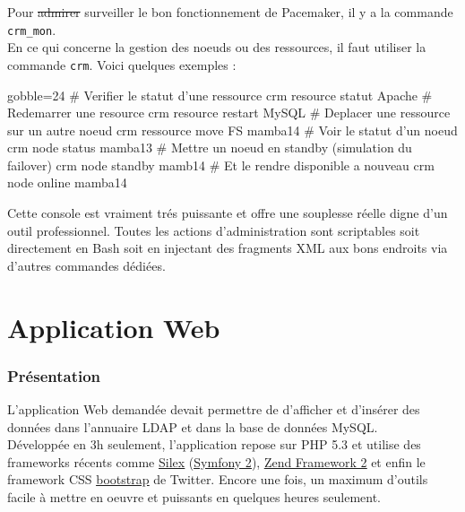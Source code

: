 \documentclass[11pt,a4paper]{report}
\begin{document}
                    Pour \st{admirer} surveiller le bon fonctionnement de Pacemaker, il y a la commande \verb+crm_mon+.\\
                    
                    En ce qui concerne la gestion des noeuds ou des ressources, il faut utiliser la commande \verb+crm+. Voici quelques exemples :\\
                    
                    \begin{bashcode*}{gobble=24}
                        # Verifier le statut d'une ressource
                        crm resource statut Apache
                        # Redemarrer une resource
                        crm resource restart MySQL
                        # Deplacer une ressource sur un autre noeud
                        crm ressource move FS mamba14
                        # Voir le statut d'un noeud
                        crm node status mamba13
                        # Mettre un noeud en standby (simulation du failover)
                        crm node standby mamb14
                        # Et le rendre disponible a nouveau
                        crm node online mamba14
                    \end{bashcode*}
                    
                    Cette console est vraiment tr\'es puissante et offre une souplesse r\'eelle digne d'un outil professionnel. Toutes les actions d'administration sont scriptables soit directement en Bash soit en injectant des fragments XML aux bons endroits via d'autres commandes d\'edi\'ees.
                    
    \part{Application Web}
        
        \section{Pr\'esentation}
            
            L'application Web demand\'ee devait permettre de d'afficher et d'ins\'erer des donn\'ees dans l'annuaire LDAP et dans la base de donn\'ees MySQL.\\
            
            D\'evelopp\'ee en 3h seulement, l'application repose sur PHP 5.3 et utilise des frameworks r\'ecents comme \underline{\href{http://silex.sensiolabs.org}{Silex}} (\underline{\href{http://symfony.com}{Symfony 2}}), \underline{\href{http://framework.zend.com}{Zend Framework 2}} et enfin le framework CSS \underline{\href{http://twitter.github.com/bootstrap}{bootstrap}} de Twitter. Encore une fois, un maximum d'outils facile \`a mettre en oeuvre et puissants en quelques heures seulement.\\
            
\end{document}
